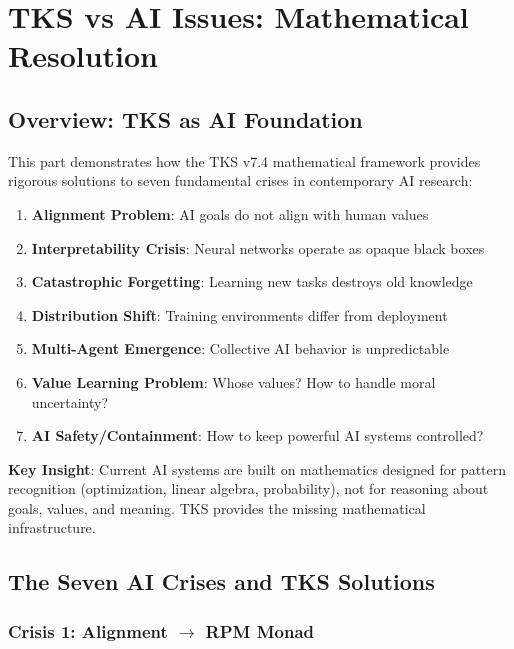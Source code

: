 \documentclass[11pt,twoside]{book}
\theoremstyle{definition}
\theoremstyle{plain}
\theoremstyle{remark}
\begin{document}
\part{TKS vs AI Issues: Mathematical Resolution}
\label{part:ai-issues}

\chapter{Overview: TKS as AI Foundation}
\label{ch:ai-overview}

\begin{tcolorbox}[colback=blue!5!white,colframe=blue!75!black,title=\textbf{Part Overview},breakable]
This part demonstrates how the TKS v7.4 mathematical framework provides rigorous solutions to seven fundamental crises in contemporary AI research:

\begin{enumerate}
    \item \textbf{Alignment Problem}: AI goals do not align with human values
    \item \textbf{Interpretability Crisis}: Neural networks operate as opaque black boxes
    \item \textbf{Catastrophic Forgetting}: Learning new tasks destroys old knowledge
    \item \textbf{Distribution Shift}: Training environments differ from deployment
    \item \textbf{Multi-Agent Emergence}: Collective AI behavior is unpredictable
    \item \textbf{Value Learning Problem}: Whose values? How to handle moral uncertainty?
    \item \textbf{AI Safety/Containment}: How to keep powerful AI systems controlled?
\end{enumerate}

\textbf{Key Insight}: Current AI systems are built on mathematics designed for pattern recognition (optimization, linear algebra, probability), not for reasoning about goals, values, and meaning. TKS provides the missing mathematical infrastructure.
\end{tcolorbox}

\chapter{The Seven AI Crises and TKS Solutions}
\label{ch:ai-crises}

\section{Crisis 1: Alignment $\to$ RPM Monad}
\end{document}
